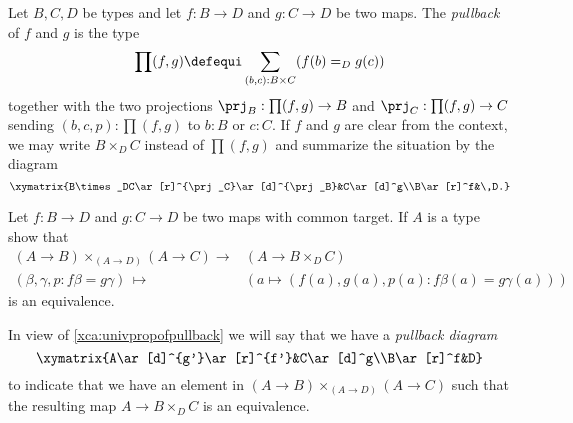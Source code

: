 \begin{definition}
  \label{def:pullback}
  Let $B, C, D$ be types and let $f:B\to D$ and $g:C\to D$ be two maps.
The \emph{pullback} of $f$ and $g$ is the type
$$\prod(f,g)\defequi\sum_{(b,c):B\times C}(f(b)=_Dg(c))$$
together with the two projections $\prj_B:\prod(f,g)\to B$ and $\prj_C:\prod(f,g)\to C$ sending $(b,c,p):\prod(f,g)$ to $b:B$ or $c:C$.  If $f$ and $g$ are clear from the context, we may write $B\times_DC$ instead of $\prod(f,g)$ and summarize the situation by the diagram
$$\xymatrix{B\times_DC\ar[r]^{\prj_C}\ar[d]^{\prj_B}&C\ar[d]^g\\B\ar[r]^f&\,D.}$$
\end{definition}
\begin{xca}
  \label{xca:univpropofpullback}
  Let $f:B\to D$ and $g:C\to D$ be two maps with common target.  If $A$ is a type show that
  \begin{align*}
    (A\to B)\times_{(A\to D)}(A\to C)\to &(A\to B\times_DC)\\
(\beta,\gamma,p:f\beta=g\gamma)\,\mapsto\,&(a\mapsto (f(a),g(a),p(a):f\beta(a)=g\gamma(a)))
  \end{align*}
 is an equivalence.
\end{xca}
In view of \cref{xca:univpropofpullback} we will say that we have a \emph{pullback diagram}
$$\xymatrix{A\ar[d]^{g'}\ar[r]^{f'}&C\ar[d]^g\\B\ar[r]^f&D}$$
to indicate that we have an element in $(A\to B)\times_{(A\to D)}(A\to C)$ such that the resulting map $A\to B\times_DC$ is an equivalence.

